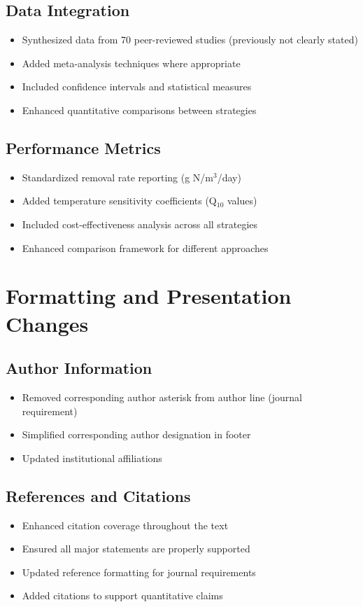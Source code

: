 \documentclass[12pt,a4paper]{article}
\begin{document}
\subsection{Data Integration}
\begin{itemize}[leftmargin=*, itemsep=0.2em]
\item Synthesized data from 70 peer-reviewed studies (previously not clearly stated)
\item Added meta-analysis techniques where appropriate
\item Included confidence intervals and statistical measures
\item Enhanced quantitative comparisons between strategies
\end{itemize}

\subsection{Performance Metrics}
\begin{itemize}[leftmargin=*, itemsep=0.2em]
\item Standardized removal rate reporting (g N/m$^3$/day)
\item Added temperature sensitivity coefficients (Q$_{10}$ values)
\item Included cost-effectiveness analysis across all strategies
\item Enhanced comparison framework for different approaches
\end{itemize}

\section{Formatting and Presentation Changes}

\subsection{Author Information}
\begin{itemize}[leftmargin=*, itemsep=0.2em]
\item Removed corresponding author asterisk from author line (journal requirement)
\item Simplified corresponding author designation in footer
\item Updated institutional affiliations
\end{itemize}

\subsection{References and Citations}
\begin{itemize}[leftmargin=*, itemsep=0.2em]
\item Enhanced citation coverage throughout the text
\item Ensured all major statements are properly supported
\item Updated reference formatting for journal requirements
\item Added citations to support quantitative claims
\end{itemize}
\end{document}
